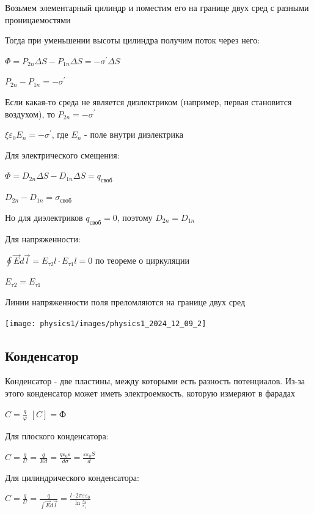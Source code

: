 \documentclass[12pt]{article}
\begin{document}
Возьмем элементарный цилиндр и поместим его на границе двух сред с разными проницаемостями

Тогда при уменьшении высоты цилиндра получим поток через него:

$\Phi = P_{2n} \Delta S - P_{1n} \Delta S = -\sigma^\prime \Delta S$

$P_{2n} - P_{1n} = -\sigma^\prime$

Если какая-то среда не является диэлектриком (например, первая становится воздухом), то $P_{2n} = -\sigma^\prime$

$\xi\varepsilon_0 E_n = -\sigma^\prime$, где $E_n$ - поле внутри диэлектрика

Для электрического смещения:

$\Phi = D_{2n} \Delta S - D_{1n} \Delta S = q_\text{своб}$

$D_{2n} - D_{1n} = \sigma_\text{своб}$ 

Но для диэлектриков $q_\text{своб} = 0$, поэтому $D_{2n} = D_{1n}$

Для напряженности:

$\oint \vec{E} d\vec{l} = E_{\tau 2} l \cdot E_{\tau 1} l = 0$ по теореме о циркуляции

$E_{\tau 2} = E_{\tau 1}$

Линии напряженности поля преломляются на границе двух сред

\begin{center}
    \texttt{[image: physics1/images/physics1\_2024\_12\_09\_2]}
\end{center}

\subsection{Конденсатор}

Конденсатор - две пластины, между которыми есть разность потенциалов. Из-за этого конденсатор может иметь электроемкость, которую измеряют в фарадах

$C = \frac{q}{\varphi}$ \hfill $[C] = \text{Ф}$

Для плоского конденсатора:

$C = \frac{q}{U} = \frac{q}{Ed} = \frac{q \varepsilon_0 \varepsilon}{d\sigma} = \frac{\varepsilon \varepsilon_0 S}{d}$

Для цилиндрического конденсатора:

$C = \frac{q}{U} = \frac{q}{\int \vec{E}d\vec{l}} = \frac{l \cdot 2\pi \varepsilon \varepsilon_0}{\ln \frac{r_2}{r_1}}$
\end{document}
